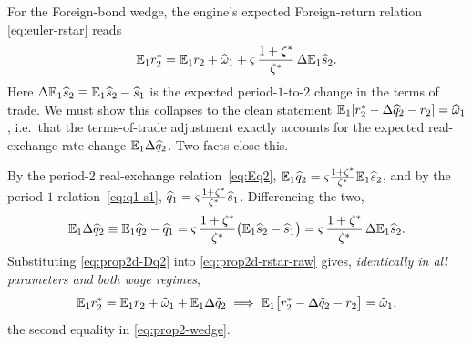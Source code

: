 For the Foreign-bond wedge, the engine's expected Foreign-return relation
\eqref{eq:euler-rstar} reads
\begin{equation}
\mathbb{E}_1r^{*}_2 = \mathbb{E}_1r_2 + \widehat{\omega}_1 + \varsigma\,\frac{1+\zeta^{*}}{\zeta^{*}}\,\Delta\mathbb{E}_1\widehat{s}_2. \label{eq:prop2d-rstar-raw}
\end{equation}
Here $\Delta\mathbb{E}_1\widehat{s}_2\equiv\mathbb{E}_1\widehat{s}_2-\widehat{s}_1$ is the expected
period-$1$-to-$2$ change in the terms of trade. We must show this collapses to
the clean statement $\mathbb{E}_1[r^{*}_2-\Delta\widehat{q}_2-r_2]=\widehat{\omega}_1$, i.e.\ that
the terms-of-trade adjustment exactly accounts for the expected
real-exchange-rate change $\mathbb{E}_1\Delta\widehat{q}_2$. Two facts close this.

By the period-$2$ real-exchange relation~\eqref{eq:Eq2},
$\mathbb{E}_1\widehat{q}_2=\varsigma\frac{1+\zeta^{*}}{\zeta^{*}}\mathbb{E}_1\widehat{s}_2$, and by the
period-$1$ relation~\eqref{eq:q1-s1},
$\widehat{q}_1=\varsigma\frac{1+\zeta^{*}}{\zeta^{*}}\widehat{s}_1$. Differencing the two,
\begin{equation}
\mathbb{E}_1\Delta\widehat{q}_2 \equiv \mathbb{E}_1\widehat{q}_2-\widehat{q}_1
= \varsigma\,\frac{1+\zeta^{*}}{\zeta^{*}}\bigl(\mathbb{E}_1\widehat{s}_2-\widehat{s}_1\bigr)
= \varsigma\,\frac{1+\zeta^{*}}{\zeta^{*}}\,\Delta\mathbb{E}_1\widehat{s}_2. \label{eq:prop2d-Dq2}
\end{equation}
Substituting \eqref{eq:prop2d-Dq2} into \eqref{eq:prop2d-rstar-raw} gives,
\emph{identically in all parameters and both wage regimes},
\begin{equation}
\mathbb{E}_1r^{*}_2 = \mathbb{E}_1r_2 + \widehat{\omega}_1 + \mathbb{E}_1\Delta\widehat{q}_2
\;\Longrightarrow\;
\mathbb{E}_1\bigl[r^{*}_2-\Delta\widehat{q}_2-r_2\bigr] = \widehat{\omega}_1, \label{eq:prop2d-rstar}
\end{equation}
the second equality in \eqref{eq:prop2-wedge}.

